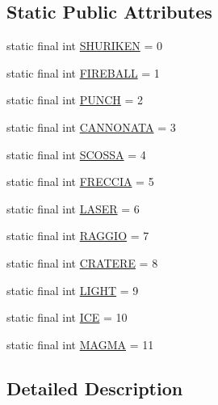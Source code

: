 \subsection*{Static Public Attributes}
\begin{DoxyCompactItemize}
\item 
static final int \hyperlink{classhelpz_1_1_constants_1_1_projectiles_aa69d45a11b219eda06b3c3a9826788c2}{S\+H\+U\+R\+I\+K\+EN} = 0
\item 
static final int \hyperlink{classhelpz_1_1_constants_1_1_projectiles_a10093581e49aae5a79878355094080ac}{F\+I\+R\+E\+B\+A\+LL} = 1
\item 
static final int \hyperlink{classhelpz_1_1_constants_1_1_projectiles_aa94441575c740c1dd3f20e3590afc576}{P\+U\+N\+CH} = 2
\item 
static final int \hyperlink{classhelpz_1_1_constants_1_1_projectiles_aeedf9679be641870b99cd19b9bdcee1c}{C\+A\+N\+N\+O\+N\+A\+TA} = 3
\item 
static final int \hyperlink{classhelpz_1_1_constants_1_1_projectiles_af4b1c3360609f1f3d4a9d86a2d469820}{S\+C\+O\+S\+SA} = 4
\item 
static final int \hyperlink{classhelpz_1_1_constants_1_1_projectiles_a81077f64b2eff28612c578d0c479d17e}{F\+R\+E\+C\+C\+IA} = 5
\item 
static final int \hyperlink{classhelpz_1_1_constants_1_1_projectiles_a24cf8309c5b910bc79f28b22353bca16}{L\+A\+S\+ER} = 6
\item 
static final int \hyperlink{classhelpz_1_1_constants_1_1_projectiles_aca40c470ca51992339f8a7a7b01362c5}{R\+A\+G\+G\+IO} = 7
\item 
static final int \hyperlink{classhelpz_1_1_constants_1_1_projectiles_a97327aa369bb85e2227b3a3556bf2c5c}{C\+R\+A\+T\+E\+RE} = 8
\item 
static final int \hyperlink{classhelpz_1_1_constants_1_1_projectiles_ad1c4b3eafbb57c6b69280072c177ba89}{L\+I\+G\+HT} = 9
\item 
static final int \hyperlink{classhelpz_1_1_constants_1_1_projectiles_af475876f2799ade95f316475badaa558}{I\+CE} = 10
\item 
static final int \hyperlink{classhelpz_1_1_constants_1_1_projectiles_acf5bf9909b001d119eb093563502eea5}{M\+A\+G\+MA} = 11
\end{DoxyCompactItemize}


\subsection{Detailed Description}


